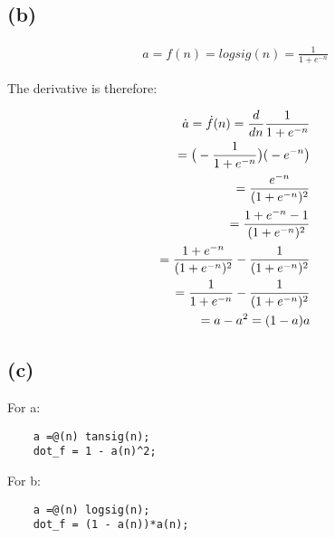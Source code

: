\documentclass[paper=a4, fontsize=12pt]{article}%
\begin{document}
\subsection{(b)}

\begin{equation}
	\begin{aligned}
		a 	= f(n) 	= logsig(n) 	= \frac{1}{1+e^{-n}}
	\end{aligned}
\end{equation}

The derivative is therefore:

\begin{equation}
	\begin{aligned}
		\dot{a} = \dot{f}(n) = \frac{d}{dn} \frac{1}{1+e^{-n}} \\
				= \big{(}- \frac{1}{1+e^{-n}}\big{) (}-e^{-n}\big{)}\\
				= \frac{e^{-n}}{(1+e^{-n})^2}\\
				= \frac{1 + e^{-n} - 1}{(1+e^{-n})^2}\\
				= \frac{1 + e^{-n}}{(1+e^{-n})^2} - \frac{1}{(1+e^{-n})^2}\\
				= \frac{1}{1+e^{-n}} - \frac{1}{(1+e^{-n})^2}\\
				= a - a^2 = (1-a)a
	\end{aligned}
\end{equation}
\subsection{(c)}
For a:
\begin{lstlisting} 
	a =@(n) tansig(n);
	dot_f = 1 - a(n)^2;
\end{lstlisting}


For b:
\begin{lstlisting} 
	a =@(n) logsig(n);
	dot_f = (1 - a(n))*a(n);
\end{lstlisting}

\end{document}

